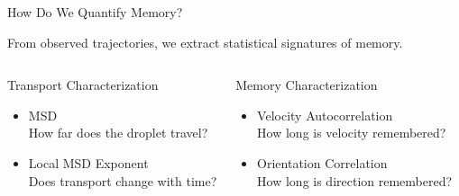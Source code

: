 \begin{frame}{How Do We Quantify Memory?}

	\centering


	\vspace{0.9cm}

	\begin{center}
		\large
		From observed trajectories, we extract statistical signatures of memory.
	\end{center}
	\begin{columns}

		\begin{block}{Transport Characterization}
			\begin{itemize}
				\item MSD
				      {\small \\How far does the droplet travel?}
				\item Local MSD Exponent
					      {\small \\Does transport change with time?}
			\end{itemize}
		\end{block}


		\begin{alertblock}{Memory Characterization}
			\begin{itemize}
				\item Velocity Autocorrelation
					      {\small \\How long is velocity remembered?}

				\item Orientation Correlation
					      {\small \\How long is direction remembered?}

			\end{itemize}
		\end{alertblock}

	\end{columns}


\end{frame}
